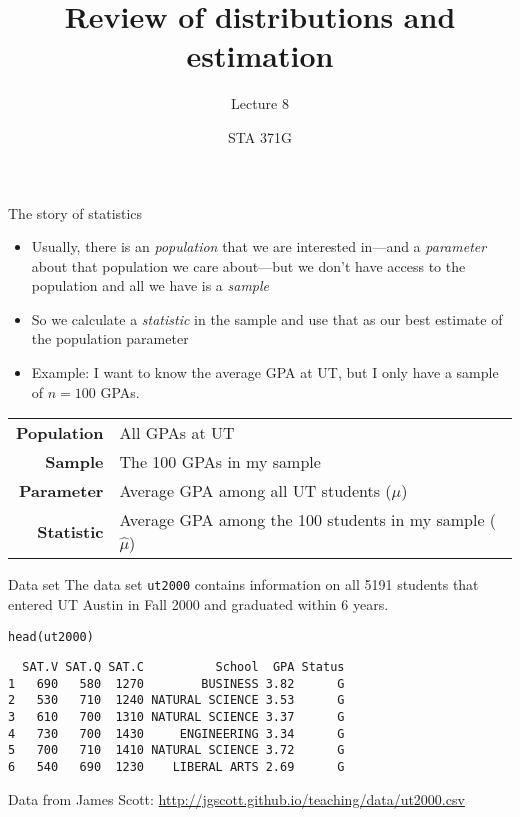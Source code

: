 \documentclass{beamer}\usepackage[]{graphicx}\usepackage[]{color}
\title{Review of distributions and estimation}
\subtitle{Lecture 8}
\author{STA 371G}
\makeatletter
\newcommand{\hlstd}[1]{\textcolor[rgb]{1,0.894,0.769}{#1}}%
\newcommand{\hlkwd}[1]{\textcolor[rgb]{1,0.78,0.769}{#1}}%
\newenvironment{kframe}{%
 \def\at@end@of@kframe{}%
 \ifinner\ifhmode%
  \def\at@end@of@kframe{\end{minipage}}%
  \begin{minipage}{\columnwidth}%
 \fi\fi%
 \def\FrameCommand##1{\hskip\@totalleftmargin \hskip-\fboxsep
 \colorbox{shadecolor}{##1}\hskip-\fboxsep
     \hskip-\linewidth \hskip-\@totalleftmargin \hskip\columnwidth}%
 \MakeFramed {\advance\hsize-\width
   \@totalleftmargin\z@ \linewidth\hsize
   \@setminipage}}%
 {\par\unskip\endMakeFramed%
 \at@end@of@kframe}
\newenvironment{knitrout}{}{} %
\makeatother
\begin{document}
\frame{\maketitle}


\begin{darkframes}

\begin{frame}{The story of statistics}
\begin{itemize}
  \item Usually, there is an \emph{population} that we are interested in---and a \emph{parameter} about that population we care about---but we don't have access to the population and all we have is a \emph{sample} \pause
  \item So we calculate a \emph{statistic} in the sample and use that as our best estimate of the population parameter \pause
  \item Example: I want to know the average GPA at UT, but I only have a sample of $n=100$ GPAs. \pause
\end{itemize}

\begin{tabular}{r|l}
\textbf{Population} & All GPAs at UT \\
\textbf{Sample} & The 100 GPAs in my sample \\
\textbf{Parameter} & Average GPA among all UT students ($\mu$) \\
\textbf{Statistic} & Average GPA among the 100 students in my sample ($\hat\mu$)
\end{tabular}
\end{frame}


\begin{frame}[fragile]{Data set}
The data set \texttt{ut2000} contains information on all 5191 students that entered UT Austin in Fall 2000 and graduated within 6 years.
\begin{knitrout}
\begin{kframe}
\begin{alltt}
\hlkwd{head}\hlstd{(ut2000)}
\end{alltt}
\begin{verbatim}
  SAT.V SAT.Q SAT.C          School  GPA Status
1   690   580  1270        BUSINESS 3.82      G
2   530   710  1240 NATURAL SCIENCE 3.53      G
3   610   700  1310 NATURAL SCIENCE 3.37      G
4   730   700  1430     ENGINEERING 3.34      G
5   700   710  1410 NATURAL SCIENCE 3.72      G
6   540   690  1230    LIBERAL ARTS 2.69      G
\end{verbatim}
\end{kframe}
\end{knitrout}
\footnotesize{Data from James Scott: \url{http://jgscott.github.io/teaching/data/ut2000.csv}}
\end{frame}



\end{darkframes}
\end{document}
